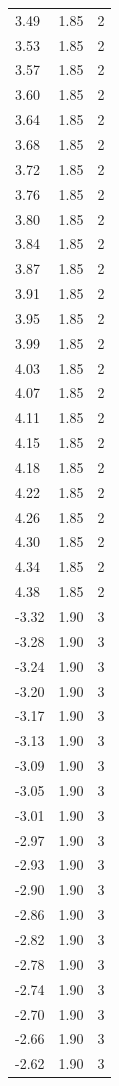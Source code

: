 \begin{longtable}{lrr}
  3.49 & 1.85 & 2 \\
  3.53 & 1.85 & 2 \\
  3.57 & 1.85 & 2 \\
  3.60 & 1.85 & 2 \\
  3.64 & 1.85 & 2 \\
  3.68 & 1.85 & 2 \\
  3.72 & 1.85 & 2 \\
  3.76 & 1.85 & 2 \\
  3.80 & 1.85 & 2 \\
  3.84 & 1.85 & 2 \\
  3.87 & 1.85 & 2 \\
  3.91 & 1.85 & 2 \\
  3.95 & 1.85 & 2 \\
  3.99 & 1.85 & 2 \\
  4.03 & 1.85 & 2 \\
  4.07 & 1.85 & 2 \\
  4.11 & 1.85 & 2 \\
  4.15 & 1.85 & 2 \\
  4.18 & 1.85 & 2 \\
  4.22 & 1.85 & 2 \\
  4.26 & 1.85 & 2 \\
  4.30 & 1.85 & 2 \\
  4.34 & 1.85 & 2 \\
  4.38 & 1.85 & 2 \\
  -3.32 & 1.90 & 3 \\
  -3.28 & 1.90 & 3 \\
  -3.24 & 1.90 & 3 \\
  -3.20 & 1.90 & 3 \\
  -3.17 & 1.90 & 3 \\
  -3.13 & 1.90 & 3 \\
  -3.09 & 1.90 & 3 \\
  -3.05 & 1.90 & 3 \\
  -3.01 & 1.90 & 3 \\
  -2.97 & 1.90 & 3 \\
  -2.93 & 1.90 & 3 \\
  -2.90 & 1.90 & 3 \\
  -2.86 & 1.90 & 3 \\
  -2.82 & 1.90 & 3 \\
  -2.78 & 1.90 & 3 \\
  -2.74 & 1.90 & 3 \\
  -2.70 & 1.90 & 3 \\
  -2.66 & 1.90 & 3 \\
  -2.62 & 1.90 & 3 \\

\end{longtable}
